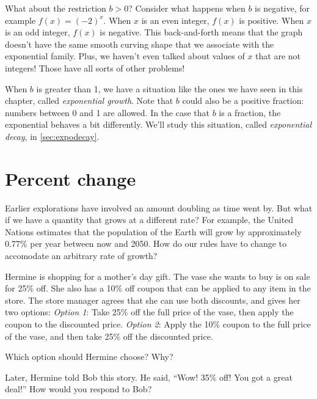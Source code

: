 What about the restriction $b>0$? Consider what happens when $b$ is negative, for example $f(x)=(-2)^x$. When $x$ is an even integer, $f(x)$ is positive. When $x$ is an odd integer, $f(x)$ is negative. This back-and-forth means that the graph doesn't have the same smooth curving shape that we associate with the exponential family. Plus, we haven't even talked about values of $x$ that are not integers! Those have all sorts of other problems!

When $b$ is greater than 1, we have a situation like the ones we have seen in this chapter, called \textit{exponential growth}. Note that $b$ could also be a positive fraction: numbers between 0 and 1 are allowed. In the case that $b$ is a fraction, the exponential behaves a bit differently. We'll study this situation, called \textit{exponential decay}, in \cref{sec:expodecay}.


\section{Percent change}
\label{sec:expopercentchange}

Earlier explorations have involved an amount doubling as time went by. But what if we have a quantity that grows at a different rate? For example, the United Nations estimates that the population of the Earth will grow by approximately 0.77\% per year between now and 2050. How do our rules have to change to accomodate an arbitrary rate of growth?

\begin{boxexplore}
Hermine is shopping for a mother's day gift. The vase she wants to buy is on sale for 25\% off. She also has a 10\% off coupon that can be applied to any item in the store. The store manager agrees that she can use both discounts, and gives her two options: \textit{Option 1}: Take 25\% off the full price of the vase, then apply the coupon to the discounted price. \textit{Option 2}: Apply the 10\% coupon to the full price of the vase, and then take 25\% off the discounted price.

Which option should Hermine choose? Why?

Later, Hermine told Bob this story. He said, ``Wow! 35\% off! You got a great deal!'' How would you respond to Bob?
\end{boxexplore}


